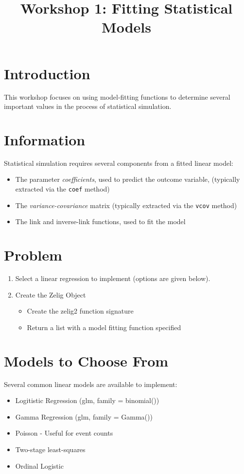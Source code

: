 \documentclass{article}
\title{Workshop 1: Fitting Statistical Models}
\begin{document}
\maketitle

\section{Introduction}

This workshop focuses on using model-fitting functions to determine several
important values in the process of statistical simulation.

\section{Information}

Statistical simulation requires several components from a fitted linear model:

\begin{itemize}
  \item The parameter \emph{coefficients}, used to predict the outcome variable,
    (typically extracted via the {\tt coef} method)
  \item The \emph{variance-covariance} matrix (typically extracted via the 
    {\tt vcov} method)
  \item The link and inverse-link functions, used to fit the model
\end{itemize}


\section{Problem}

\begin{enumerate}
  \item Select a linear regression to implement (options are given below).
    
  \item Create the Zelig Object
    \begin{itemize}
      \item Create the zelig2 function signature
      \item Return a list with a model fitting function specified
    \end{itemize}

\end{enumerate}

\section{Models to Choose From}

Several common linear models are available to implement:

\begin{itemize}
  \item Logitistic Regression (glm, family = binomial())
  \item Gamma Regression (glm, family = Gamma())
  \item Poisson - Useful for event counts
  \item Two-stage least-squares
  \item Ordinal Logistic
\end{itemize}
\end{document}
